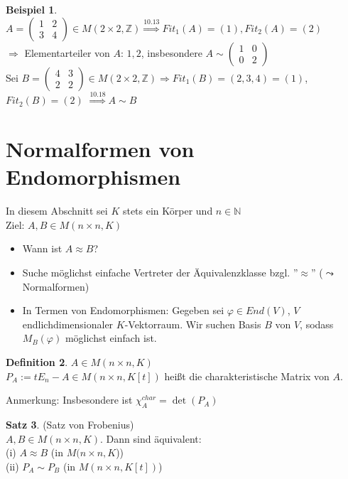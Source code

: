 \documentclass[10pt,a4paper,numbers=endperiod]{scrartcl}
\theoremstyle{definition}
\newtheorem{satz}{Satz}[section]
\newtheorem{defi}[satz]{Definition}
\newtheorem{bsp}[satz]{Beispiel}
\def\NN{{\mathbb N}}
\def\ZZ{{\mathbb Z}}
\begin{document}
\begin{bsp}
	$A = \begin{pmatrix}
	1 & 2\\
	3 & 4
	\end{pmatrix} \in M(2 \times 2, \ZZ) \overset{10.13}{\Rightarrow} Fit_1(A) = (1), Fit_2(A) = (2)$\\
	$\Rightarrow$ Elementarteiler von $A$: $1, 2$, insbesondere $A \sim \begin{pmatrix}
	1 & 0\\
	0 & 2
	\end{pmatrix}$\\
	Sei $B = \begin{pmatrix}
	4 & 3\\
	2 & 2
	\end{pmatrix} \in M(2 \times 2, \ZZ) \Rightarrow Fit_1(B) = (2,3,4) = (1)$, $Fit_2(B) = (2)$ $\overset{10.18}{\Rightarrow} A \sim B$
\end{bsp}
\newpage
\section{Normalformen von Endomorphismen}

In diesem Abschnitt sei $K$ stets ein Körper und $n \in \NN$\\

Ziel: $A, B \in M(n \times n, K)$
\begin{itemize}
	\item Wann ist $A \approx B$?
	\item Suche möglichst einfache Vertreter der Äquivalenzklasse bzgl. ''$\approx$'' ($\leadsto$ Normalformen)
	\item In Termen von Endomorphismen: Gegeben sei $\varphi \in End(V)$, $V$ endlichdimensionaler $K$-Vektorraum. Wir suchen Basis $B$ von $V$, sodass $M_B(\varphi)$ möglichst einfach ist.
\end{itemize}

\begin{defi}
	$A \in M(n \times n, K)$\\
	$P_A := t E_n - A \in M(n \times n, K[t])$ heißt die charakteristische Matrix von $A$.
\end{defi}

Anmerkung: Insbesondere ist $\chi_A^{char} = \det(P_A)$

\begin{satz}
	(Satz von Frobenius)\\
	$A, B \in M(n \times n, K)$. Dann sind äquivalent:\\
	(i) $A \approx B$ (in $M(n \times n, K$))\\
	(ii) $P_A \sim P_B$ (in $M(n \times n,K[t])$)
\end{satz}
\end{document}
